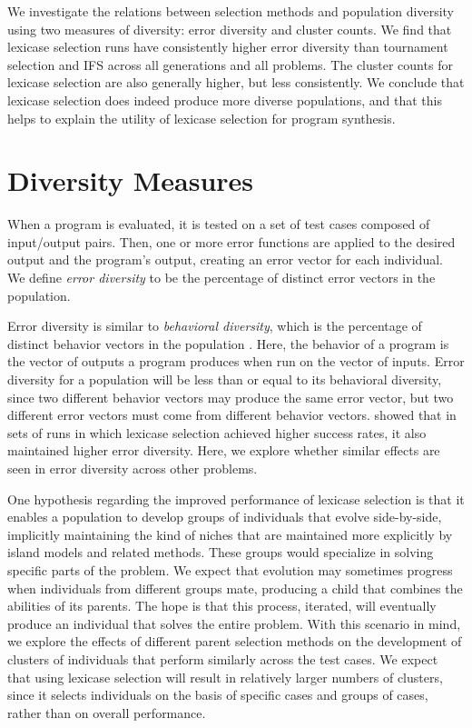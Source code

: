 We investigate the relations between selection methods and population diversity using two measures of  diversity: 
error diversity and cluster counts. We find that lexicase selection runs have consistently 
higher error diversity than tournament selection and IFS across all generations and all problems. The cluster 
counts for lexicase selection are also generally higher, but less consistently. We conclude that lexicase selection does indeed produce more diverse populations, and that this helps to explain 
the utility of lexicase selection for program synthesis.

\section{Diversity Measures}


When a program is evaluated, it is tested on a set of test cases composed of input/output pairs. Then, one or more error functions are applied to the desired output and the program's output, creating an error vector for each individual. We define \textit{error diversity} to be the percentage of distinct error vectors in the population. 

Error diversity is similar to \textit{behavioral diversity}, which is the percentage of distinct behavior vectors in the population \citep{Jackson:2010:PPSN}. Here, the behavior of a program is the vector of outputs a program produces when run on the vector of inputs. Error diversity for a population will be less than or equal to its behavioral diversity, since two different behavior vectors may produce the same error vector, but two different error vectors must come from different behavior vectors.
\cite{Helmuth:2014:ieeeTEC} showed that in sets of runs in which lexicase selection achieved higher success rates, 
it also maintained higher error diversity. Here, we  explore whether similar 
effects are seen in error diversity across other problems.

One hypothesis regarding the improved performance of lexicase selection is that it enables a population to develop groups of individuals that evolve side-by-side, implicitly maintaining the kind of niches that are maintained more explicitly by island models and related methods. These groups would specialize in solving specific parts of the problem. We expect that evolution may sometimes progress when individuals from different groups mate, producing a child that combines the abilities of its parents. The hope is that this process, iterated, will eventually produce an individual that solves the entire problem. With this scenario in mind, we explore the effects of different parent selection methods on the development of clusters of individuals that perform similarly across the test cases. We expect that using lexicase selection will result in relatively larger numbers of clusters, since it selects individuals on the basis of specific cases and groups of cases, rather than on overall performance.

